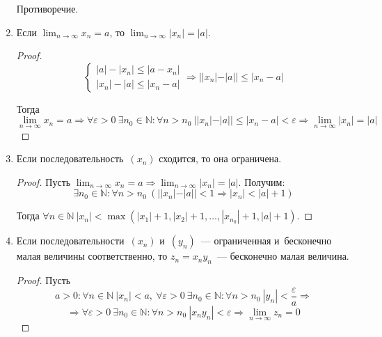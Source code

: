 \begin{enumerate}
\begin{proofcontra}
	Противоречие.
	\end{proofcontra}
	
	\item Если $\displaystyle \lim_{n \to \infty} x_n = a$, то $\displaystyle \lim_{n \to \infty} |x_n| = |a|$.
	\begin{proof}
	\begin{equation*}
	\begin{cases}
	|a| - |x_n| \leqslant |a - x_n| \\
	|x_n| - |a| \leqslant |x_n - a|
	\end{cases}
	\Rightarrow ||x_n| - |a|| \leqslant |x_n - a|
	\end{equation*}
	
	Тогда
	\begin{equation*}
	\lim_{n \to \infty} x_n = a \Rightarrow
	\forall \varepsilon > 0 \ \exists n_0 \in \mathbb N \colon \forall n > n_0 \ ||x_n| - |a|| \leqslant |x_n - a| < \varepsilon \Rightarrow
	\lim_{n \to \infty} |x_n| = |a|
	\end{equation*}
	\end{proof}
	
	\item Если последовательность~$(x_n)$ сходится, то она ограничена.
	\begin{proof}
	Пусть $\displaystyle \lim_{n \to \infty} x_n = a \Rightarrow \lim_{n \to \infty} |x_n| = |a|$.
	Получим:
	\begin{equation*}
	\exists n_0 \in \mathbb N \colon \forall n > n_0 \ (||x_n| - |a|| < 1 \Rightarrow |x_n| < |a| + 1)
	\end{equation*}
	
	Тогда $\forall n \in \mathbb N \ |x_n| < \max(|x_1| + 1, |x_2| + 1, \ldots, |x_{n_0}| + 1, |a| + 1)$.
	\end{proof}
	
	\item Если последовательности~$(x_n)$ и~$(y_n)$~--- ограниченная и~бесконечно малая величины соответственно, то $z_n = x_n y_n$~--- бесконечно малая величина.
	\begin{proof}
	Пусть
	\begin{equation*}
	a > 0 \colon \forall n \in \mathbb N \ |x_n| < a, \ \forall \varepsilon > 0 \ \exists n_0 \in \mathbb N \colon \forall n > n_0 \ |y_n| < \frac\varepsilon{a} \Rightarrow
	\end{equation*}
	\begin{equation*}
	\Rightarrow \forall \varepsilon > 0 \ \exists n_0 \in \mathbb N \colon \forall n > n_0 \ |x_n y_n| < \varepsilon \Rightarrow \lim_{n \to \infty} z_n = 0
	\end{equation*}
	\end{proof}
	

\end{enumerate}

